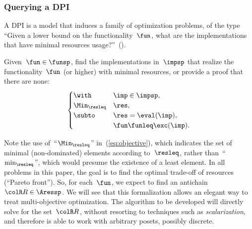 \subsubsection{Querying a DPI}

A DPI is a model that induces a family of optimization problems, of
the type ``Given a lower bound on the functionality~$\fun$, what
are the implementations that have minimal resources usage?''~().
\begin{problem}
\label{prob:problem1}Given~$\fun\in\funsp$, find the implementations
in~$\impsp$ that realize the functionality~$\fun$ (or higher)
with minimal resources, or provide a proof that there are none:
\begin{equation}
\begin{cases}
\with & \imp\in\impsp,\\
\Min_{\resleq} & \res,\\
\subto & \res=\eval(\imp),\\
 & \fun\funleq\exc(\imp).
\end{cases}\label{eq:objective}
\end{equation}
\end{problem}


\begin{rem}
Note the use of~``$\Min_{\resleq}$'' in~(\ref{eq:objective}),
which indicates the set of minimal (non-dominated) elements according
to~$\resleq$, rather than~``$\min_{\resleq}$'', which would
presume the existence of a least element. In all problems in this
paper, the goal is to find the optimal trade-off of resources (``Pareto
front''). So, for each~$\fun$, we expect to find an antichain~${\colR R}\in\Aressp$.
We will see that this formalization allows an elegant way to treat
multi-objective optimization. The algorithm to be developed will directly
solve for the set~${\colR R}$, without resorting to techniques such
as \emph{scalarization}, and therefore is able to work with arbitrary
posets, possibly discrete.
\end{rem}

